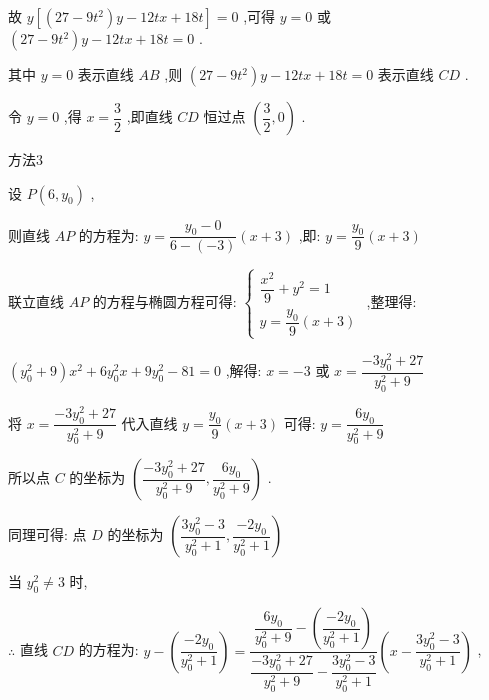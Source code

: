 \begin{enumerate}
\begin{enumerate}
\begin{jieda}
\begin{enumerate}
                故 $y\left\lbrack  {\left( {{27} - 9{t}^{2}}\right) y - {12tx} + {18t}}\right\rbrack   = 0$ ,可得 $y = 0$ 或 $\left( {{27} - 9{t}^{2}}\right) y - {12tx} + {18t} = 0$ .
                
                其中 $y = 0$ 表示直线 ${AB}$ ,则 $\left( {{27} - 9{t}^{2}}\right) y - {12tx} + {18t} = 0$ 表示直线 ${CD}$ .
                
                令 $y = 0$ ,得 $x = \dfrac{3}{2}$ ,即直线 ${CD}$ 恒过点 $\left( {\dfrac{3}{2},0}\right)$ .
         
            方法3
    
            设 $P\left( {6,{y}_{0}}\right)$ ,
            
            则直线 ${AP}$ 的方程为: $y = \dfrac{{y}_{0} - 0}{6 - \left( {-3}\right) }\left( {x + 3}\right)$ ,即: $y = \dfrac{{y}_{0}}{9}\left( {x + 3}\right)$
            
            联立直线 ${AP}$ 的方程与椭圆方程可得: $\left\{  \begin{array}{l} \dfrac{{x}^{2}}{9} + {y}^{2} = 1 \\  y = \dfrac{{y}_{0}}{9}\left( {x + 3}\right)  \end{array}\right.$ ,整理得:
            
            $\left( {{y}_{0}^{2} + 9}\right) {x}^{2} + 6{y}_{0}^{2}x + 9{y}_{0}^{2} - {81} = 0$ ,解得: $x =  - 3$ 或 $x = \dfrac{-3{y}_{0}^{2} + {27}}{{y}_{0}^{2} + 9}$
            
            将 $x = \dfrac{-3{y}_{0}^{2} + {27}}{{y}_{0}^{2} + 9}$ 代入直线 $y = \dfrac{{y}_{0}}{9}\left( {x + 3}\right)$ 可得: $y = \dfrac{6{y}_{0}}{{y}_{0}^{2} + 9}$
            
            所以点 $C$ 的坐标为 $\left( {\dfrac{-3{y}_{0}^{2} + {27}}{{y}_{0}^{2} + 9},\dfrac{6{y}_{0}}{{y}_{0}^{2} + 9}}\right)$ .
            
            同理可得: 点 $D$ 的坐标为 $\left( {\dfrac{3{y}_{0}^{2} - 3}{{y}_{0}^{2} + 1},\dfrac{-2{y}_{0}}{{y}_{0}^{2} + 1}}\right)$
            
            当 ${y}_{0}^{2} \neq  3$ 时,
            
            $\therefore$ 直线 ${CD}$ 的方程为: $y - \left( \dfrac{-2{y}_{0}}{{y}_{0}^{2} + 1}\right)  = \dfrac{\dfrac{6{y}_{0}}{{y}_{0}^{2} + 9} - \left( \dfrac{-2{y}_{0}}{{y}_{0}^{2} + 1}\right) }{\dfrac{-3{y}_{0}^{2} + {27}}{{y}_{0}^{2} + 9} - \dfrac{3{y}_{0}^{2} - 3}{{y}_{0}^{2} + 1}}\left( {x - \dfrac{3{y}_{0}^{2} - 3}{{y}_{0}^{2} + 1}}\right)$ ,
            

\end{enumerate}
\end{jieda}
\end{enumerate}
\end{enumerate}

